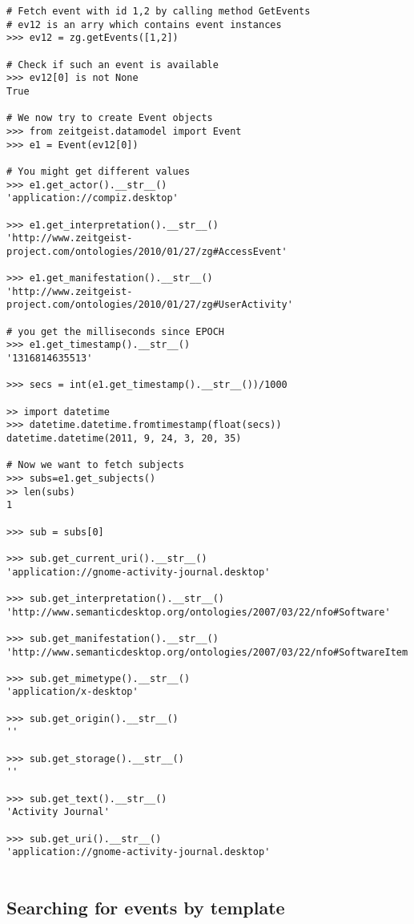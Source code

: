 \begin{center}
\begin{verbatim}
# Fetch event with id 1,2 by calling method GetEvents
# ev12 is an arry which contains event instances
>>> ev12 = zg.getEvents([1,2])

# Check if such an event is available
>>> ev12[0] is not None
True

# We now try to create Event objects
>>> from zeitgeist.datamodel import Event
>>> e1 = Event(ev12[0])

# You might get different values
>>> e1.get_actor().__str__()
'application://compiz.desktop'

>>> e1.get_interpretation().__str__()
'http://www.zeitgeist-project.com/ontologies/2010/01/27/zg#AccessEvent'

>>> e1.get_manifestation().__str__()
'http://www.zeitgeist-project.com/ontologies/2010/01/27/zg#UserActivity'

# you get the milliseconds since EPOCH
>>> e1.get_timestamp().__str__()
'1316814635513'

>>> secs = int(e1.get_timestamp().__str__())/1000

>> import datetime
>>> datetime.datetime.fromtimestamp(float(secs))
datetime.datetime(2011, 9, 24, 3, 20, 35)

# Now we want to fetch subjects
>>> subs=e1.get_subjects()
>> len(subs)
1

>>> sub = subs[0]

>>> sub.get_current_uri().__str__()
'application://gnome-activity-journal.desktop'

>>> sub.get_interpretation().__str__()
'http://www.semanticdesktop.org/ontologies/2007/03/22/nfo#Software'

>>> sub.get_manifestation().__str__()
'http://www.semanticdesktop.org/ontologies/2007/03/22/nfo#SoftwareItem'

>>> sub.get_mimetype().__str__()
'application/x-desktop'

>>> sub.get_origin().__str__()
''

>>> sub.get_storage().__str__()
''

>>> sub.get_text().__str__()
'Activity Journal'

>>> sub.get_uri().__str__()
'application://gnome-activity-journal.desktop'


\end{verbatim}
\end{center}

\subsection{Searching for events by template}

